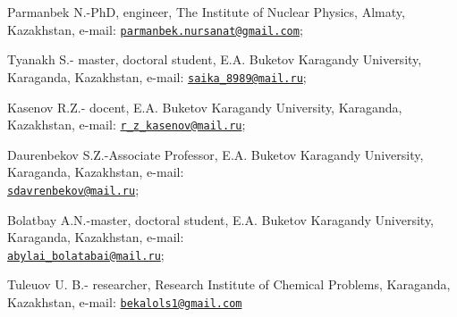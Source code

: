 \begin{authorinfo}
Parmanbek N.-PhD, engineer, The Institute of Nuclear Physics, Almaty,
Kazakhstan, e-mail:
\href{mailto:parmanbek.nursanat@gmail.com}{\nolinkurl{parmanbek.nursanat@gmail.com}};

Tyanakh S.- master, doctoral student, E.A. Buketov Karagandy University,
Karaganda, Kazakhstan, e-mail:
\href{mailto:saika_8989@mail.ru}{\nolinkurl{saika\_8989@mail.ru}};

Kasenov R.Z.- docent, E.A. Buketov Karagandy University, Karaganda,
Kazakhstan, e-mail:
\href{mailto:r_z_kasenov@mail.ru}{\nolinkurl{r\_z\_kasenov@mail.ru}};

Daurenbekov S.Z.-Associate Professor, E.A. Buketov Karagandy University,
Karaganda, Kazakhstan, e-mail:\\
\href{mailto:sdavrenbekov@mail.ru}{\nolinkurl{sdavrenbekov@mail.ru}};

Bolatbay A.N.-master, doctoral student, E.A. Buketov Karagandy
University, Karaganda, Kazakhstan, e-mail:\\
\href{mailto:abylai_bolatabai@mail.ru}{\nolinkurl{abylai\_bolatabai@mail.ru}};

Tuleuov U. B.- researcher, Research Institute of Chemical Problems,
Karaganda, Kazakhstan, e-mail:
\href{mailto:bekalols1@gmail.com}{\nolinkurl{bekalols1@gmail.com}}
\end{authorinfo}
